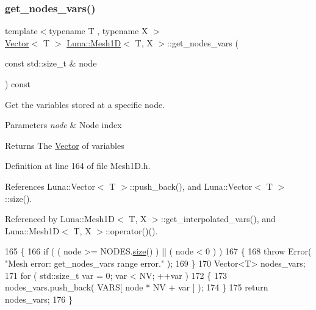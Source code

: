 \subsubsection{\texorpdfstring{get\+\_\+nodes\+\_\+vars()}{get\_nodes\_vars()}}
{\footnotesize\ttfamily template$<$typename T , typename X $>$ \\
\hyperlink{classLuna_1_1Vector}{Vector}$<$ T $>$ \hyperlink{classLuna_1_1Mesh1D}{Luna\+::\+Mesh1D}$<$ T, X $>$\+::get\+\_\+nodes\+\_\+vars (\begin{DoxyParamCaption}\item[{const std\+::size\+\_\+t \&}]{node }\end{DoxyParamCaption}) const\hspace{0.3cm}{\ttfamily [inline]}}



Get the variables stored at a specific node. 


\begin{DoxyParams}{Parameters}
{\em node} & Node index \\
\hline
\end{DoxyParams}
\begin{DoxyReturn}{Returns}
The \hyperlink{classLuna_1_1Vector}{Vector} of variables 
\end{DoxyReturn}


Definition at line 164 of file Mesh1\+D.\+h.



References Luna\+::\+Vector$<$ T $>$\+::push\+\_\+back(), and Luna\+::\+Vector$<$ T $>$\+::size().



Referenced by Luna\+::\+Mesh1\+D$<$ T, X $>$\+::get\+\_\+interpolated\+\_\+vars(), and Luna\+::\+Mesh1\+D$<$ T, X $>$\+::operator()().


\begin{DoxyCode}
165   \{
166     \textcolor{keywordflow}{if} ( ( node >= NODES.\hyperlink{classLuna_1_1Vector_ac9b6ed7a0df401728f27c193fbc8f4d8}{size}() ) || ( node < 0 ) )
167     \{
168       \textcolor{keywordflow}{throw} Error( \textcolor{stringliteral}{"Mesh error: get\_nodes\_vars range error."} );
169     \}
170     Vector<T> nodes\_vars;
171     \textcolor{keywordflow}{for} ( std::size\_t var = 0; var < NV; ++var )
172     \{
173       nodes\_vars.push\_back( VARS[ node * NV + var ] );
174     \}
175     \textcolor{keywordflow}{return} nodes\_vars;
176   \}
\end{DoxyCode}
\mbox{\label{classLuna_1_1Mesh1D_af317b96151dcd9aa9d31f4814740d3be}} 
